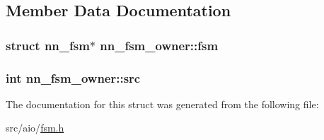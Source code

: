 \subsection{Member Data Documentation}
\subsubsection[{fsm}]{\setlength{\rightskip}{0pt plus 5cm}struct {\bf nn\+\_\+fsm}$\ast$ nn\+\_\+fsm\+\_\+owner\+::fsm}\hypertarget{structnn__fsm__owner_ae05ede92ec1327579eb015bb707546b4}{}\label{structnn__fsm__owner_ae05ede92ec1327579eb015bb707546b4}
\subsubsection[{src}]{\setlength{\rightskip}{0pt plus 5cm}int nn\+\_\+fsm\+\_\+owner\+::src}\hypertarget{structnn__fsm__owner_aab85be21a9bebaeb264d7626829c8632}{}\label{structnn__fsm__owner_aab85be21a9bebaeb264d7626829c8632}


The documentation for this struct was generated from the following file\+:\begin{DoxyCompactItemize}
\item 
src/aio/\hyperlink{fsm_8h}{fsm.\+h}\end{DoxyCompactItemize}
